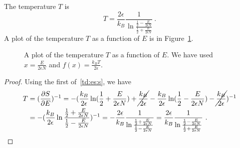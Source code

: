     The temperature $T$ is 
    \begin{equation*}
        T = \frac{2 \epsilon}{k_B} \frac{1}{\ln \frac{\frac{1}{2} - \frac{E}{2 \epsilon N}}{\frac{1}{2} + \frac{E}{2 \epsilon N}}} ~.
    \end{equation*}
    A plot of the temperature $T$ as a function of $E$ is in Figure~\ref{en:t}.
    \begin{figure}
        \centering
        \caption{A plot of the temperature $T$ as a function of $E$. We have used $x = \frac{E}{2 \epsilon N} $ and $f(x) = \frac{k_B T}{2 \epsilon}$.}
        \label{en:t}
    \end{figure}
    \begin{proof}
        Using the first of~\eqref{td:es:s}, we have
        \begin{equation*}
        \begin{aligned}
            T & = (\frac{\partial S}{\partial E})^{-1} = - (\frac{k_B}{2\epsilon} \ln (\frac{1}{2} + \frac{E}{2 \epsilon N}) + \cancel{\frac{k_B}{2\epsilon}} - \frac{k_B}{2\epsilon} \ln (\frac{1}{2} - \frac{E}{2 \epsilon N}) - \cancel{\frac{k_B}{2\epsilon}} )^{-1} \\ & = - (\frac{k_B}{2\epsilon} \ln \frac{\frac{1}{2} + \frac{E}{2 \epsilon N}}{\frac{1}{2} - \frac{E}{2 \epsilon N}})^{-1} = - \frac{2 \epsilon}{k_B} \frac{1}{\ln \frac{\frac{1}{2} + \frac{E}{2 \epsilon N}}{\frac{1}{2} - \frac{E}{2 \epsilon N}}} = \frac{2 \epsilon}{k_B} \frac{1}{\ln \frac{\frac{1}{2} - \frac{E}{2 \epsilon N}}{\frac{1}{2} + \frac{E}{2 \epsilon N}}} ~.
        \end{aligned}
        \end{equation*}
    \end{proof}
    
